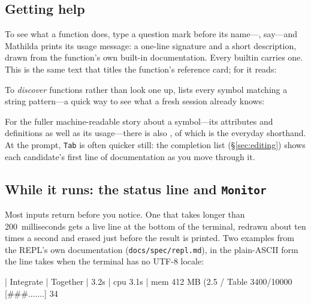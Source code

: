 \subsection{Getting help}
\label{sec:help}

To see what a function does, type a question mark before its name---,
say---and Mathilda prints its usage message: a one-line signature and a short
description, drawn from the function's own built-in documentation. Every builtin
carries one. This is the same text that titles the function's reference card; for
 it reads:


To \emph{discover} functions rather than look one up,  lists every symbol
matching a string pattern---a quick way to see what a fresh session already knows:

\begin{codepairs}
\end{codepairs}

\noindent
For the fuller machine-readable story about a symbol---its attributes and
definitions as well as its usage---there is also , of which
 is the everyday shorthand. At the prompt, \texttt{Tab} is often
quicker still: the completion list (\S\ref{sec:editing}) shows each candidate's
first line of documentation as you move through it.

\subsection{While it runs: the status line and \texttt{Monitor}}
\label{sec:statusline}

Most inputs return before you notice. One that takes longer than 200~milliseconds
gets a live line at the bottom of the terminal, redrawn about ten times a second
and erased just before the result is printed. Two examples from the REPL's own
documentation (\texttt{docs/spec/repl.md}), in the plain-ASCII form the line takes
when the terminal has no UTF-8 locale:

\begin{shell}
| Integrate | Together | 3.2s | cpu 3.1s | mem 412 MB (2.5%
/ Table 3400/10000 [###.......] 34%
\end{shell}

